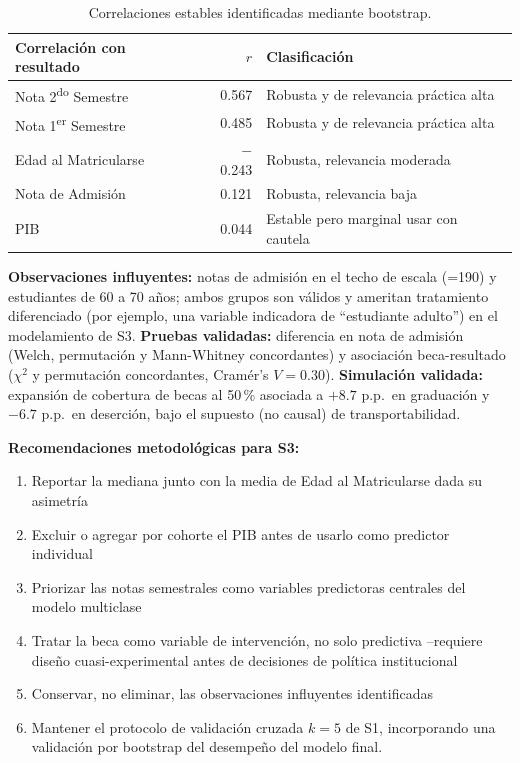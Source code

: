 \documentclass[11pt,a4paper]{article}
\begin{document}
\vspace{-0.6em}
\begin{table}[h!]
\centering
\small
\begin{tabular}{lrl}
\toprule
\textbf{Correlación con resultado} & \textbf{$r$} & \textbf{Clasificación} \\
\midrule
Nota 2\textsuperscript{do} Semestre & 0.567 & Robusta y de relevancia práctica alta \\
Nota 1\textsuperscript{er} Semestre & 0.485 & Robusta y de relevancia práctica alta \\
Edad al Matricularse                & $-$0.243 & Robusta, relevancia moderada \\
Nota de Admisión                    & 0.121 & Robusta, relevancia baja \\
PIB                                 & 0.044 & Estable pero marginal usar con cautela\\
\bottomrule
\end{tabular}
\caption{Correlaciones estables identificadas mediante bootstrap.}
\label{tab:resumen_corr}
\end{table}

\textbf{Observaciones influyentes:} notas de admisión en el techo de escala (=190) y
estudiantes de 60 a 70 años; ambos grupos son válidos y ameritan tratamiento diferenciado (por
ejemplo, una variable indicadora de ``estudiante adulto'') en el modelamiento de S3.
\textbf{Pruebas validadas:} diferencia en nota de admisión (Welch, permutación y Mann-Whitney
concordantes) y asociación beca-resultado ($\chi^2$ y permutación concordantes, Cramér's
$V=0.30$). \textbf{Simulación validada:} expansión de cobertura de becas al 50\,\% asociada a
$+8.7$ p.p.\ en graduación y $-6.7$ p.p.\ en deserción, bajo el supuesto (no causal) de
transportabilidad.

\textbf{Recomendaciones metodológicas para S3:} 

\begin{enumerate}
    \item Reportar la mediana junto con la media de
Edad al Matricularse dada su asimetría
    \item Excluir o agregar por cohorte el PIB antes de
usarlo como predictor individual
    \item Priorizar las notas semestrales como variables
predictoras centrales del modelo multiclase
    \item  Tratar la beca como variable de
intervención, no solo predictiva --requiere diseño cuasi-experimental antes de decisiones de
política institucional
    \item Conservar, no eliminar, las observaciones influyentes identificadas
    \item Mantener el protocolo de validación cruzada $k=5$ de S1, incorporando una validación por bootstrap del desempeño del modelo final.
\end{enumerate}
\end{document}
